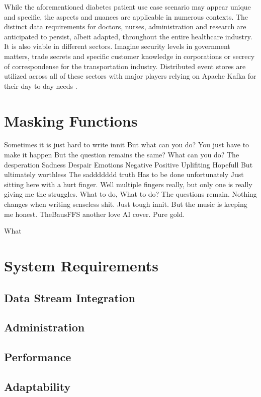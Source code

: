 While the aforementioned diabetes patient use case scenario may appear unique and specific, the aspects and nuances are applicable in numerous contexts. The distinct data requirements for doctors, nurses, administration and research are anticipated to persist, albeit adapted, throughout the entire healthcare industry. 
It is also viable in different sectors. Imagine security levels in government matters, trade secrets and specific customer knowledge in corporations or secrecy of correspondense for the transportation industry. Distributed event stores are utilized across all of these sectors with major players relying on Apache Kafka for their day to day needs \cite{KafkaPoweredBY}. 

\section{Masking Functions}

Sometimes it is just hard to  write innit 
But what can you do?
You just have to make it happen
But the question remains the same? 
What can you do?
The desperation
Sadness
Despair
Emotions
Negative
Positive
Uplifiting
Hopefull
But ultimately worthless
The saddddddd truth
Has to be done unfortunately
Just sitting here with a hurt finger. Well multiple fingers really, but only one is really giving me the struggles. What to do, What to do?
The questions remain. Nothing changes when writing senseless shit. Just tough innit. But the music is keeping me honest. TheBausFFS another love AI cover. Pure gold. 

What 

\section{System Requirements}
\subsection{Data Stream Integration}
\subsection{Administration}
\subsection{Performance}
\subsection{Adaptability}
